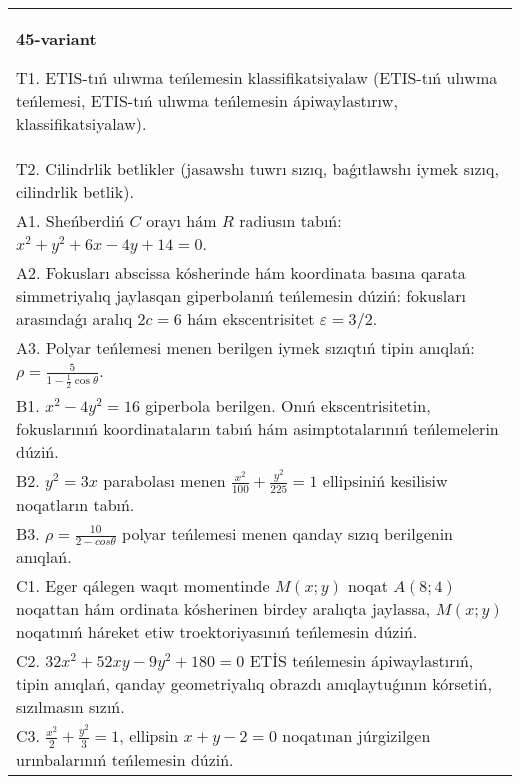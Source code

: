 \documentclass{article}
\begin{document}
\begin{tabular}{m{17cm}}
\textbf{45-variant}
\newline

T1. ETIS-tıń ulıwma teńlemesin klassifikatsiyalaw (ETIS-tıń ulıwma teńlemesi, ETIS-tıń ulıwma teńlemesin ápiwaylastırıw, klassifikatsiyalaw).\\

T2. Cilindrlik betlikler (jasawshı tuwrı sızıq, baǵıtlawshı iymek sızıq, cilindrlik betlik).\\

A1. Sheńberdiń $C$ orayı hám $R$ radiusın tabıń: $x^2+y^2+6 x-4 y+14=0$.\\

A2. Fokusları abscissa kósherinde hám koordinata basına qarata simmetriyalıq jaylasqan giperbolanıń teńlemesin dúziń: fokusları arasındaǵı aralıq $2 c=6$ hám ekscentrisitet $\varepsilon=3/2$.\\

A3. Polyar teńlemesi menen berilgen iymek sızıqtıń tipin anıqlań: $\rho=\frac{5}{1-\frac{1}{2}\cos\theta}$.\\

B1. $x^{2} - 4y^{2} = 16$ giperbola berilgen. Onıń ekscentrisitetin, fokuslarınıń koordinataların tabıń hám asimptotalarınıń teńlemelerin dúziń.\\

B2. $y^{2} = 3x$ parabolası menen $\frac{x^{2}}{100} + \frac{y^{2}}{225} = 1$ ellipsiniń kesilisiw noqatların tabıń.  \\

B3. $\rho = \frac{10}{2 - cos\theta}$ polyar teńlemesi menen qanday sızıq berilgenin anıqlań.  \\

C1. Eger qálegen waqıt momentinde $M(x;y)$ noqat $A(8;4)$ noqattan hám ordinata kósherinen birdey aralıqta jaylassa, $M(x;y)$ noqatınıń háreket etiw troektoriyasınıń teńlemesin dúziń.  \\

C2. $32x^{2} + 52xy - 9y^{2} + 180 = 0$ ETİS teńlemesin ápiwaylastırıń, tipin anıqlań, qanday geometriyalıq obrazdı anıqlaytuǵının kórsetiń, sızılmasın sızıń.  \\

C3. $\frac{x^{2}}{2} + \frac{y^{2}}{3} = 1$, ellipsin $x + y - 2 = 0$ noqatınan júrgizilgen urınbalarınıń teńlemesin dúziń.  \\

\end{tabular}
\vspace{1cm}
\end{document}
